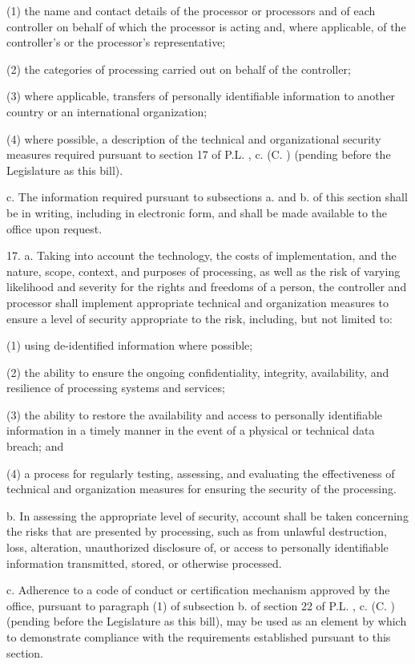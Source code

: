      (1)   the name and contact details of the processor or processors and of each controller on behalf of which the processor is acting and, where applicable, of the controller's or the processor's representative;

     (2)   the categories of processing carried out on behalf of the controller;

     (3)   where applicable, transfers of personally identifiable information to another country or an international organization;

     (4)   where possible, a description of the technical and organizational security measures required pursuant to section 17 of P.L.    , c.    (C.      ) (pending before the Legislature as this bill).

     c.     The information required pursuant to subsections a. and b. of this section shall be in writing, including in electronic form, and shall be made available to the office upon request.

 

     17.  a.  Taking into account the technology, the costs of implementation, and the nature, scope, context, and purposes of processing, as well as the risk of varying likelihood and severity for the rights and freedoms of a person, the controller and processor shall implement appropriate technical and organization measures to ensure a level of security appropriate to the risk, including, but not limited to:

     (1)   using de-identified information where possible;

     (2)   the ability to ensure the ongoing confidentiality, integrity, availability, and resilience of processing systems and services;

     (3)   the ability to restore the availability and access to personally identifiable information in a timely manner in the event of a physical or technical data breach; and

     (4)   a process for regularly testing, assessing, and evaluating the effectiveness of technical and organization measures for ensuring the security of the processing.

     b.    In assessing the appropriate level of security, account shall be taken concerning the risks that are presented by processing, such as from unlawful destruction, loss, alteration, unauthorized disclosure of, or access to personally identifiable information transmitted, stored, or otherwise processed.

     c.     Adherence to a code of conduct or certification mechanism approved by the office, pursuant to paragraph (1) of subsection b. of section 22 of P.L.    , c.    (C.      ) (pending before the Legislature as this bill), may be used as an element by which to demonstrate compliance with the requirements established pursuant to this section.

